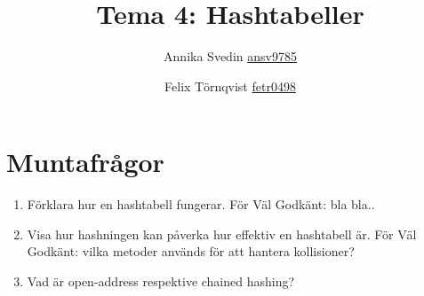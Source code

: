 \documentclass[a5paper,10pt,oneside]{article}
\title{Tema 4: Hashtabeller}
\author{Annika Svedin \url{ansv9785} \and Felix Törnqvist \url{fetr0498}}
\begin{document}
\maketitle

\section*{Muntafrågor}

\begin{enumerate}
	\item Förklara hur en hashtabell fungerar. För Väl Godkänt: bla bla..
	
	\item Visa hur hashningen kan påverka hur effektiv en hashtabell är. För Väl Godkänt: vilka metoder används för att hantera kollisioner?
	
	\item Vad är open-address respektive chained hashing?
\end{enumerate}
\end{document}
